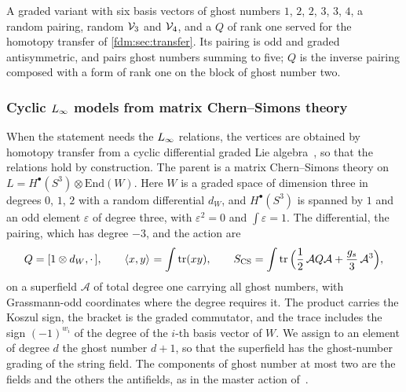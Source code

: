 A graded variant with six basis vectors of ghost numbers $1$, $2$, $2$, $3$, $3$, $4$, a random pairing, random $\mathcal{V}_{3}$ and $\mathcal{V}_{4}$, and a $Q$ of rank one served for the homotopy transfer of \cref{fdm:sec:transfer}.
Its pairing is odd and graded antisymmetric, and pairs ghost numbers summing to five; $Q$ is the inverse pairing composed with a form of rank one on the block of ghost number two.

\subsubsection{Cyclic \texorpdfstring{$L_\infty$}{L-infinity} models from matrix Chern--Simons theory}
\label{fdm:sec:general:cs}

When the statement needs the $L_\infty$ relations, the vertices are obtained by homotopy transfer from a cyclic differential graded Lie algebra~\cite{Kajiura:2007:NoncommutativeHomotopyAlgebras,Doubek:2013:ModularOperadsQuantum}, so that the relations hold by construction.
The parent is a matrix Chern--Simons theory on $L = H^\bullet(S^3) \otimes \mathrm{End}(W)$.
Here $W$ is a graded space of dimension three in degrees $0$, $1$, $2$ with a random differential $d_W$, and $H^\bullet(S^3)$ is spanned by $1$ and an odd element $\varepsilon$ of degree three, with $\varepsilon^2 = 0$ and $\int \varepsilon = 1$.
The differential, the pairing, which has degree $-3$, and the action are
\begin{equation}
  \label{fdm:eq:fm:cs-action}
  Q
    = [1 \otimes d_W, \cdot\,],
  \qquad
  \braket{x, y}_{}
    = \int \operatorname{tr}(xy),
  \qquad
  S_{\mathrm{CS}}
    = \int \operatorname{tr} \Big( \frac{1}{2} \, \mathcal A Q \mathcal A + \frac{g_s}{3} \, \mathcal A^3 \Big),
\end{equation}
on a superfield $\mathcal A$ of total degree one carrying all ghost numbers, with Grassmann-odd coordinates where the degree requires it.
The product carries the Koszul sign, the bracket is the graded commutator, and the trace includes the sign $(-1)^{w_i}$ of the degree of the $i$-th basis vector of $W$.
We assign to an element of degree $d$ the ghost number $d + 1$, so that the superfield has the ghost-number grading of the string field.
The components of ghost number at most two are the fields and the others the antifields, as in the master action of~\cite{Zwiebach:1993:ClosedStringField}.

